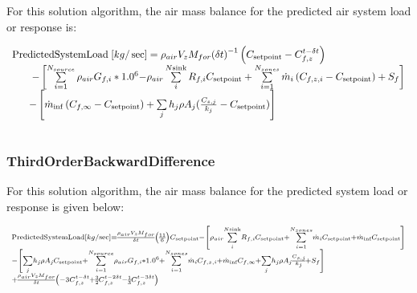 For this solution algorithm, the air mass balance for the predicted air system load or response is:

\begin{equation}
\begin{array}{l}{\rm{PredictedSystemLoad}}\;[kg/\sec ] = {\rho_{air}}{V_z}{M_{for}}{\left( {\delta t} \right)^{ - 1}}\left( {{C_{{\rm{setpoint}}}} - C_{f,z}^{t - \delta t}} \right)\\\;\;\;\;\;\;\; - \left[ {\sum\limits_{i = 1}^{{N_{source}}} {{\rho_{air}}{G_{f,i}}*{{1.0}^6} - } {\rho_{air}}\sum\limits_i^{N{\rm{sink}}} {{R_{f,i}}{C_{{\rm{setpoint}}}}}  + \sum\limits_{i = 1}^{{N_{zones}}} {{{\dot m}_i}} \left( {{C_{f,z,i}} - {C_{{\rm{setpoint}}}}} \right) + {S_f}} \right]\\\;\;\;\;\;\; - \left[ {{{\dot m}_{\inf }}\left( {{C_{f,\infty }} - {C_{{\rm{setpoint}}}}} \right) + \sum\limits_j {{h_j}\rho {A_j}(\frac{{{C_{s,j}}}}{{{k_j}}} - {C_{{\rm{setpoint}}}})} } \right]\;\\\;\;\;\;\;\;\;\;\;\;\;\;\;\;\;\;\end{array}
\end{equation}

\subsubsection{ThirdOrderBackwardDifference}\label{thirdorderbackwarddifference-000}

For this solution algorithm, the air mass balance for the predicted system load or response is given below:

\begin{equation}
\medmuskip=0mu
\thinmuskip=0mu
\thickmuskip=0mu
\nulldelimiterspace=0pt
\scriptspace=0pt
\scriptsize{\begin{array}{l}{\rm{PredictedSystemLoad}}\;[kg/\sec ] = \frac{{{\rho_{air}}{V_z}{M_{for}}}}{{\delta t}}\left( {\frac{{11}}{6}} \right){C_{{\rm{setpoint}}}} - \left[ {{\rho_{air}}\sum\limits_i^{N{\rm{sink}}} {{R_{f,i}}{C_{{\rm{setpoint}}}}}  + \sum\limits_{i = 1}^{{N_{zones}}} {{{\dot m}_i}} {C_{{\rm{setpoint}}}} + {{\dot m}_{\inf }}{C_{{\rm{setpoint}}}}} \right]\\\;\;\;\;\;\;\;\;\;\;\;\;\;\;\; - \left[ {\sum\limits_j {{h_j}\rho {A_j}{C_{{\rm{setpoint}}}}}  + \sum\limits_{i = 1}^{{N_{source}}} {{\rho_{air}}{G_{f,i}}*{{1.0}^6}}  + \sum\limits_{i = 1}^{{N_{zones}}} {{{\dot m}_i}} {C_{f,z,i}} + {{\dot m}_{\inf }}{C_{f,\infty }} + \sum\limits_j {{h_j}\rho {A_j}\frac{{{C_{s,j}}}}{{{k_j}}} + {S_f}} } \right]\\\;\;\;\;\;\;\;\;\;\;\;\;\;\;\; + \frac{{{\rho_{air}}{V_z}{M_{for}}}}{{\delta t}}\left( { - 3C_{f,z}^{t - \delta t} + \frac{3}{2}C_{f,z}^{t - 2\delta t} - \frac{1}{3}C_{f,z}^{t - 3\delta t}} \right)\end{array}}
\end{equation}

